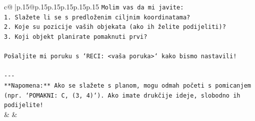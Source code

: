 \documentclass{article}
\begin{document}
{\begin{supertabular}{c@{$\;$}|p{.15\linewidth}@{}p{.15\linewidth}p{.15\linewidth}p{.15\linewidth}p{.15\linewidth}p{.15\linewidth}}
{{{\texttt{Molim vas da mi javite:} \\
\texttt{1. Slažete li se s predloženim ciljnim koordinatama?} \\
\texttt{2. Koje su pozicije vaših objekata (ako ih želite podijeliti)?} \\
\texttt{3. Koji objekt planirate pomaknuti prvi?} \\
\\ 
\texttt{Pošaljite mi poruku s `RECI: <vaša poruka>` kako bismo nastavili!} \\
\\ 
\texttt{{-}{-}{-}} \\
\texttt{**Napomena:** Ako se slažete s planom, mogu odmah početi s pomicanjem (npr. `POMAKNI: C, (3, 4)`). Ako imate drukčije ideje, slobodno ih podijelite!} \\
            }
        }
    }
    & & \\ \\


\end{supertabular}}
\end{document}
